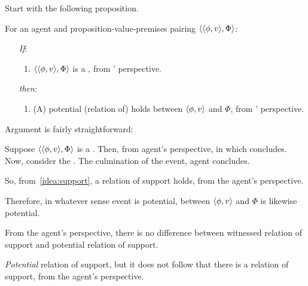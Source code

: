 \begin{note}
  Start with the following proposition.
  \begin{proposition}
    \label{prop:fcs-only-if-pot-support}
    For an agent \vAgent{} and proposition-value-premises pairing \(\langle \langle \phi, v \rangle, \Phi \rangle\):
    \begin{enumerate}
    \item[\emph{If}:]
      \begin{enumerate}[label=\alph*., ref=(\alph*.)]
      \item
        \(\langle \langle \phi, v \rangle, \Phi \rangle\) is a , from \vAgent{}' perspective.
      \end{enumerate}
    \item[\emph{then}:]
      \begin{enumerate}[label=\alph*., ref=(\alph*.), resume]
      \item
        (A) potential (relation of) \support{} holds between \(\langle \phi, v \rangle\) and \(\Phi\), from \vAgent{}' perspective.
      \end{enumerate}
    \end{enumerate}
    \vspace{-\baselineskip}
  \end{proposition}

  Argument is fairly straightforward:
  \begin{argument}
    Suppose \(\langle \langle \phi, v \rangle, \Phi \rangle\) is a .
    Then, from agent's perspective, \pevent{} in which concludes.
    Now, consider the \pevent{}.
    The culmination of the event, agent concludes.

    So, from~\autoref{idea:support}, a relation of support holds, from the agent's perspective.

    Therefore, in whatever sense event is potential, \support{} between \(\langle \phi, v \rangle\) and \(\Phi\) is likewise potential.
  \end{argument}
  From the agent's perspective, there is no difference between witnessed relation of support and potential relation of support.
\end{note}

\begin{note}
  \emph{Potential} relation of support, but it does not follow that there is a relation of support, from the agent's perspective.
\end{note}


